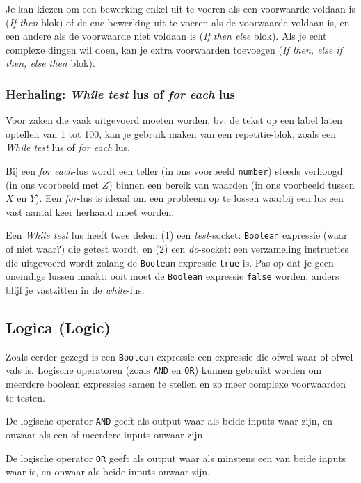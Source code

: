 Je kan kiezen om een bewerking enkel uit te voeren als een voorwaarde voldaan is (\emph{If then} blok) of de ene bewerking uit te voeren als de voorwaarde voldaan is, en een andere als de voorwaarde niet voldaan is (\emph{If then else} blok). Als je echt complexe dingen wil doen, kan je extra voorwaarden toevoegen (\emph{If then, else if then, else then} blok).

\subsubsection{Herhaling: \emph{While test} lus of \emph{for each} lus}

Voor zaken die vaak uitgevoerd moeten worden, bv. de tekst op een label laten optellen van 1 tot 100, kan je gebruik maken van een repetitie-blok, zoals een \emph{While test} lus of \emph{for each} lus.


Bij een \emph{for each}-lus wordt een teller (in ons voorbeeld \texttt{number}) steeds verhoogd (in ons voorbeeld met $Z$) binnen een bereik van waarden (in ons voorbeeld tussen $X$ en $Y$). Een \emph{for}-lus is ideaal om een probleem op te lossen waarbij een lus een vast aantal keer herhaald moet worden.

Een \emph{While test} lus heeft twee delen: (1) een \emph{test}-socket: \texttt{Boolean} expressie (waar of niet waar?) die getest wordt, en (2) een \emph{do}-socket: een verzameling instructies die uitgevoerd wordt zolang de \texttt{Boolean} expressie \texttt{true} is. Pas op dat je geen oneindige lussen maakt: ooit moet de \texttt{Boolean} expressie \texttt{false} worden, anders blijf je vastzitten in de \emph{while}-lus.

\subsection{Logica (Logic)}

Zoals eerder gezegd is een \texttt{Boolean} expressie een expressie die ofwel waar of ofwel vals is.
Logische operatoren (zoals \texttt{AND} en \texttt{OR}) kunnen gebruikt worden om meerdere boolean expressies samen te stellen en zo meer complexe voorwaarden te testen. 

De logische operator \texttt{AND} geeft als output waar als beide inputs waar zijn, en onwaar als een of meerdere inputs onwaar zijn. 

De logische operator \texttt{OR} geeft als output waar als minstens een van beide inputs waar is, en onwaar als beide inputs onwaar zijn.


